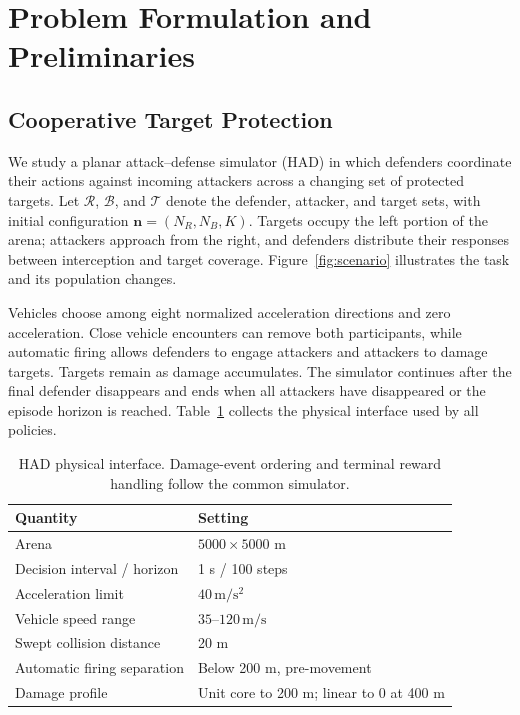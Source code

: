 \section{Problem Formulation and Preliminaries}
\label{sec:problem}
\subsection{Cooperative Target Protection}
We study a planar attack--defense simulator (HAD) in which defenders coordinate their actions against incoming attackers across a changing set of protected targets. Let $\mathcal R$, $\mathcal B$, and $\mathcal T$ denote the defender, attacker, and target sets, with initial configuration $\mathbf n=(N_R,N_B,K)$. Targets occupy the left portion of the arena; attackers approach from the right, and defenders distribute their responses between interception and target coverage. Figure~\ref{fig:scenario} illustrates the task and its population changes.

Vehicles choose among eight normalized acceleration directions and zero acceleration. Close vehicle encounters can remove both participants, while automatic firing allows defenders to engage attackers and attackers to damage targets. Targets remain as damage accumulates. The simulator continues after the final defender disappears and ends when all attackers have disappeared or the episode horizon is reached. Table~\ref{tab:environment} collects the physical interface used by all policies.

\begin{table}[t]
\centering\footnotesize
\caption{HAD physical interface. Damage-event ordering and terminal reward handling follow the common simulator.}
\label{tab:environment}
\begin{tabular}{@{}ll@{}}\toprule
Quantity & Setting\\\midrule
Arena & $5000\times5000$ m\\
Decision interval / horizon & 1 s / 100 steps\\
Acceleration limit & $40\,\mathrm{m/s^2}$\\
Vehicle speed range & $35$--$120\,\mathrm{m/s}$\\
Swept collision distance & 20 m\\
Automatic firing separation & Below 200 m, pre-movement\\
Damage profile & Unit core to 200 m; linear to 0 at 400 m\\
\bottomrule\end{tabular}
\end{table}

